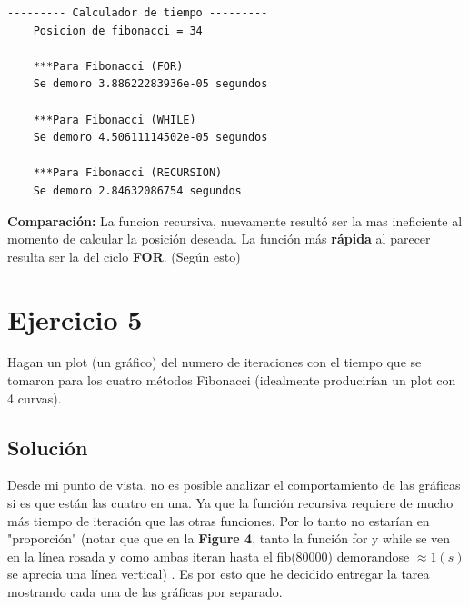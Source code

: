 \documentclass{article}
\begin{document}
    \begin{lstlisting}[style=C,numbers=none]
     --------- Calculador de tiempo ---------
    Posicion de fibonacci = 34
    
    ***Para Fibonacci (FOR)
    Se demoro 3.88622283936e-05 segundos
    
    ***Para Fibonacci (WHILE)
    Se demoro 4.50611114502e-05 segundos
    
    ***Para Fibonacci (RECURSION)
    Se demoro 2.84632086754 segundos
    \end{lstlisting}
\textbf{Comparación:} La funcion recursiva, nuevamente resultó ser la mas ineficiente al momento de calcular la posición deseada. La función más \textbf{rápida} al parecer resulta ser la del ciclo \textbf{FOR}. (Según esto)



\newpage
\section{Ejercicio 5}
 Hagan un plot (un gráfico) del numero de iteraciones con el tiempo que se tomaron para los cuatro métodos Fibonacci (idealmente producirían un plot con 4 curvas).

\subsection{Solución}
    
Desde mi punto de vista, no es posible analizar el comportamiento de las gráficas si es que están las cuatro en una. Ya que la función recursiva requiere de mucho más tiempo de iteración que las otras funciones. Por lo tanto no estarían en "proporción" (notar que que en la \textbf{Figure 4}, tanto la función for y while se ven en la línea rosada y como ambas iteran hasta el fib(80000) demorandose $\approx 1(s)$ se aprecia una línea vertical) . Es por esto que he decidido entregar la tarea mostrando cada una de las gráficas por separado.
\end{document}
